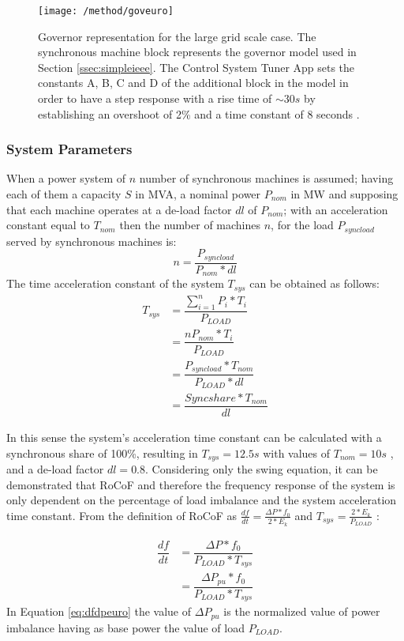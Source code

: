 \begin{figure}[h]
\centering
\texttt{[image: /method/goveuro]}
\caption{Governor representation for the large grid scale case. The synchronous machine block represents the governor model used in Section \ref{ssec:simpleieee}. The Control System Tuner App sets the constants A, B, C and D of the additional block in the model in order to have a step response with a rise time of $ \sim30s $ by establishing an overshoot of 2\% and a time constant of 8 seconds \cite{ogata1999ingenieria}.}
\label{fig:goveuro}
\end{figure}




\subsubsection{System Parameters}

When a power system of $ n $ number of synchronous machines is assumed; having each of them a capacity $ S $ in MVA, a nominal power $ P_{nom} $ in MW and
supposing that each machine operates at a de-load factor $ dl $ of $ P_{nom} $; with an acceleration constant equal to $ T_{nom} $ then the number of machines $ n $, for the load $ P_{syncload} $ served by synchronous machines is:
\begin{equation}
n=\dfrac{P_{syncload}}{P_{nom}*dl}
\end{equation}
The time acceleration constant of the system $ T_{sys} $ can be obtained as follows:
\begin{align}
T_{sys} &=\dfrac{\sum_{i=1}^nP_i*T_i}{P_{LOAD}}\nonumber \\
&=\dfrac{nP_{nom}*T_i}{P_{LOAD}}\nonumber \\
&=\dfrac{P_{syncload}*T_{nom}}{P_{LOAD}*dl}\nonumber\\
&=\dfrac{Sync share*T_{nom}}{dl} \label{eq:tsyseuro}
\end{align}




In this sense the system's acceleration time constant can be calculated with a synchronous share of 100\%, resulting in $ T_{sys}=12.5s $ with values of $ T_{nom}=10s $ \cite{ENTSOE.2016, Anderson.2002}, and a de-load factor $ dl=0.8 $. Considering only the swing equation, it can be demonstrated that RoCoF and therefore the frequency response of the system is only dependent on the percentage of load imbalance and the system acceleration time constant.
From the definition of RoCoF as $ \frac{df}{dt}=\frac{\Delta P*f_0}{2*E_k} $ and $ T_{sys}=\frac{2*E_k}{P_{LOAD}} $ :

\begin{align}
\dfrac{df}{dt} &=\dfrac{\Delta P*f_0}{P_{LOAD}*T_{sys}} \nonumber\\
&=\dfrac{\Delta P_{pu}*f_0}{P_{LOAD}*T_{sys}}
\label{eq:dfdpeuro}
\end{align}
In Equation \eqref{eq:dfdpeuro} the value of $ \Delta P_{pu} $ is the normalized value of power imbalance having as base power the value of load $ P_{LOAD} $.